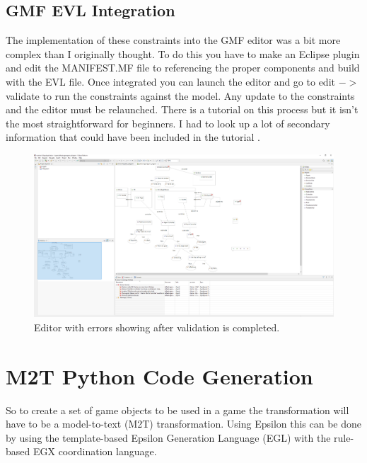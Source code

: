\documentclass[letterpaper,12pt]{article}  %
\begin{document}
\subsection{GMF EVL Integration}
The implementation of these constraints into the GMF editor was a bit more complex than I originally thought. To do this you have to make an Eclipse plugin and edit the MANIFEST.MF file to referencing the proper components and build with the EVL file. Once integrated you can launch the editor and go to edit $->$ validate to run the constraints against the model. Any update to the constraints and the editor must be relaunched. There is a tutorial on this process \cite{noauthor_live_nodate} but it isn’t the most straightforward for beginners. I had to look up a lot of secondary information that could have been included in the tutorial \cite{noauthor_eclipse_nodate}.

\begin{figure}[h]  %
    \centering  %
    \includegraphics[width = 12 cm ]{Editor with Constraints.png}
    \caption{Editor with errors showing after validation is completed.}
    \label{fig:errors}
\end{figure}

\newpage
\section{M2T Python Code Generation}
So to create a set of game objects to be used in a game the transformation will have to be a model-to-text (M2T) transformation. Using Epsilon this can be done by using the template-based Epsilon Generation Language (EGL) with the rule-based EGX coordination language.
\end{document}
